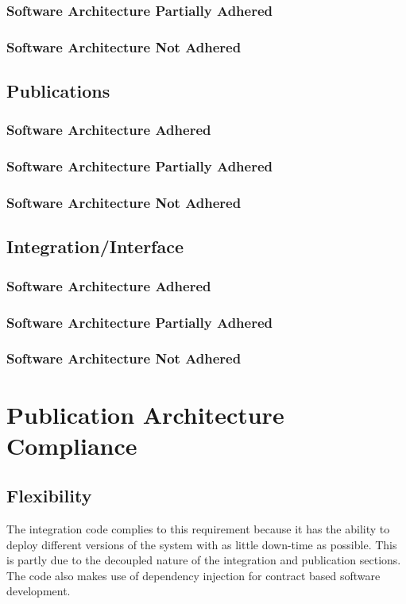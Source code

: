 \documentclass{article}
\begin{document}
		\subsubsection{Software Architecture Partially Adhered}
		\subsubsection{Software Architecture Not Adhered}		
		
	\subsection{Publications}
		\subsubsection{Software Architecture Adhered}
		\subsubsection{Software Architecture Partially Adhered}
		\subsubsection{Software Architecture Not Adhered}		
		
	\subsection{Integration/Interface}
		\subsubsection{Software Architecture Adhered}
		\subsubsection{Software Architecture Partially Adhered}
		\subsubsection{Software Architecture Not Adhered}		
		
\section{Publication Architecture Compliance}
    \subsection{Flexibility}
    The integration code complies to this requirement because it has the ability to deploy different versions of the system with as little down-time as possible. This is partly due to the decoupled nature of the integration and publication sections. The code also makes use of dependency injection for contract based software development.
    
\end{document}
